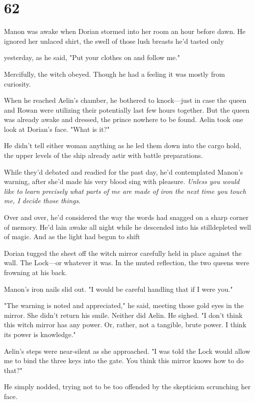 
\chapter{62}

Manon was awake when Dorian stormed into her room an hour before dawn. He ignored her unlaced shirt, the swell of those lush breasts he'd tasted only

yesterday, as he said, "Put your clothes on and follow me."

Mercifully, the witch obeyed. Though he had a feeling it was mostly from curiosity.

When he reached Aelin's chamber, he bothered to knock---just in case the queen and Rowan were utilizing their potentially last few hours together. But the queen was already awake and dressed, the prince nowhere to be found. Aelin took one look at Dorian's face. "What is it?"

He didn't tell either woman anything as he led them down into the cargo hold, the upper levels of the ship already astir with battle preparations.

While they'd debated and readied for the past day, he'd contemplated Manon's warning, after she'd made his very blood sing with pleasure.
\emph{Unless you would like to learn precisely what parts of me are made of iron the next time you touch me, I decide those things.}

Over and over, he'd considered the way the words had snagged on a sharp corner of memory. He'd lain awake all night while he descended into his stilldepleted well of magic. And as the light had begun to shift


Dorian tugged the sheet off the witch mirror carefully held in place against the wall. The Lock---or whatever it was. In the muted reflection, the two queens were frowning at his back.

Manon's iron nails slid out. "I would be careful handling that if I were you."

"The warning is noted and appreciated," he said, meeting those gold eyes in the mirror. She didn't return his smile. Neither did Aelin. He sighed. "I don't think this witch mirror has any power. Or, rather, not a tangible, brute power. I think its power is knowledge."

Aelin's steps were near-silent as she approached. "I was told the Lock would allow me to bind the three keys into the gate. You think this mirror knows how to do that?"

He simply nodded, trying not to be too offended by the skepticism scrunching her face.

